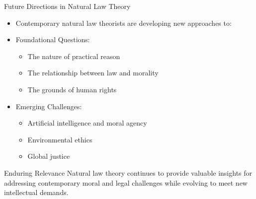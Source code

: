 \documentclass{beamer}
\begin{document}
\begin{frame}{Future Directions in Natural Law Theory}
    \begin{itemize}
        \item Contemporary natural law theorists are developing new approaches to:
        
        \item Foundational Questions:
        \begin{itemize}
            \item The nature of practical reason
            \item The relationship between law and morality
            \item The grounds of human rights
        \end{itemize}
        
        \item Emerging Challenges:
        \begin{itemize}
            \item Artificial intelligence and moral agency
            \item Environmental ethics
            \item Global justice
        \end{itemize}
    \end{itemize}
    
    \begin{alertblock}{Enduring Relevance}
        Natural law theory continues to provide valuable insights for addressing contemporary moral and legal challenges while evolving to meet new intellectual demands.
    \end{alertblock}
\end{frame}
\end{document}
